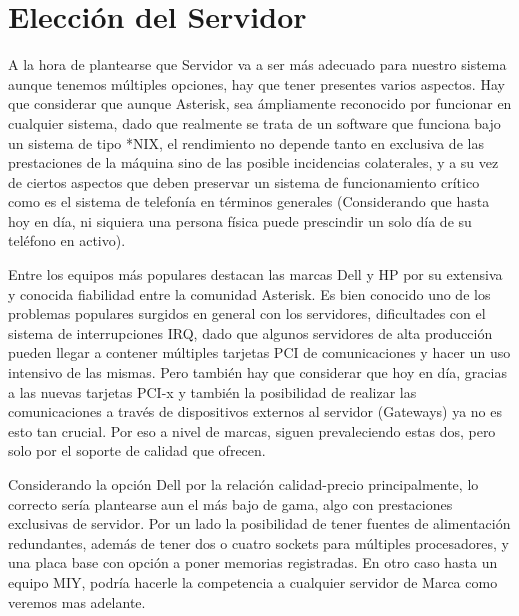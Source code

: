 
\section{Elección del Servidor}

A la hora de plantearse que Servidor va a ser más adecuado para nuestro sistema aunque tenemos múltiples opciones, hay que tener presentes varios aspectos. Hay que considerar que aunque Asterisk, sea ámpliamente reconocido por funcionar en cualquier sistema, dado que realmente se trata de un software que funciona bajo un sistema de tipo *NIX, el rendimiento no depende tanto en exclusiva de las prestaciones de la máquina sino de las posible incidencias colaterales, y a su vez de ciertos aspectos que deben preservar un sistema de funcionamiento crítico como es el sistema de telefonía en términos generales (Considerando que hasta hoy en día, ni siquiera una persona física puede prescindir un solo día de su teléfono en activo).

Entre los equipos más populares destacan las marcas Dell y HP por su extensiva y conocida fiabilidad entre la comunidad Asterisk. Es bien conocido uno de los problemas populares surgidos en general con los servidores, dificultades con el sistema de interrupciones IRQ, dado que algunos servidores de alta producción pueden llegar a contener múltiples tarjetas PCI de comunicaciones  y hacer un uso intensivo de las mismas. Pero también hay que considerar que hoy en día, gracias a las nuevas tarjetas PCI-x y también la posibilidad de realizar las comunicaciones a través de dispositivos externos al servidor (Gateways) ya no es esto tan crucial. Por eso a nivel de marcas, siguen prevaleciendo estas dos, pero solo por el soporte de calidad que ofrecen. 

Considerando la opción Dell por la relación calidad-precio principalmente, lo  correcto sería plantearse aun el más bajo de gama, algo con prestaciones exclusivas de servidor. Por un lado la posibilidad de tener fuentes de alimentación redundantes, además de tener dos o cuatro sockets para múltiples procesadores, y una placa base con opción a poner memorias registradas. En otro caso hasta un equipo MIY, podría hacerle la competencia a cualquier servidor de Marca como veremos mas adelante.

